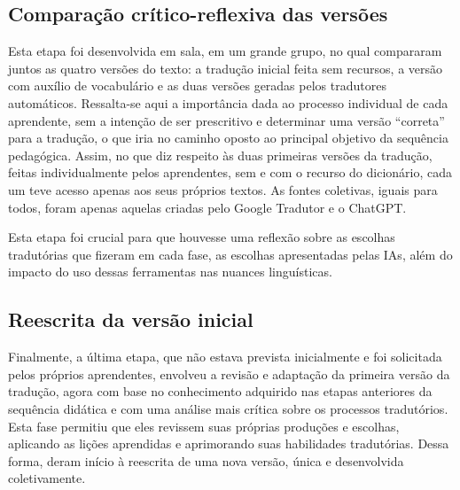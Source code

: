 \documentclass[portuguese]{textolivre}
\begin{document}
\subsection{Comparação crítico-reflexiva das versões}\label{sec-4d}
Esta etapa foi desenvolvida em sala, em um grande grupo, no qual compararam juntos as quatro versões do texto: a tradução inicial feita sem recursos, a versão com auxílio de vocabulário e as duas versões geradas pelos tradutores automáticos. Ressalta-se aqui a importância dada ao processo individual de cada aprendente, sem a intenção de ser prescritivo e determinar uma versão “correta” para a tradução, o que iria no caminho oposto ao principal objetivo da sequência pedagógica. Assim, no que diz respeito às duas primeiras versões da tradução, feitas individualmente pelos aprendentes, sem e com o recurso do dicionário, cada um teve acesso apenas aos seus próprios textos. As fontes coletivas, iguais para todos, foram apenas aquelas criadas pelo Google Tradutor e o ChatGPT.

Esta etapa foi crucial para que houvesse uma reflexão sobre as escolhas tradutórias que fizeram em cada fase, as escolhas apresentadas pelas IAs, além do impacto do uso dessas ferramentas nas nuances linguísticas.


\subsection{Reescrita da versão inicial}\label{sec-4e}
Finalmente, a última etapa, que não estava prevista inicialmente e foi solicitada pelos próprios aprendentes, envolveu a revisão e adaptação da primeira versão da tradução, agora com base no conhecimento adquirido nas etapas anteriores da sequência didática e com uma análise mais crítica sobre os processos tradutórios. Esta fase permitiu que eles revissem suas próprias produções e escolhas, aplicando as lições aprendidas e aprimorando suas habilidades tradutórias. Dessa forma, deram início à reescrita de uma nova versão, única e desenvolvida coletivamente.
\end{document}
